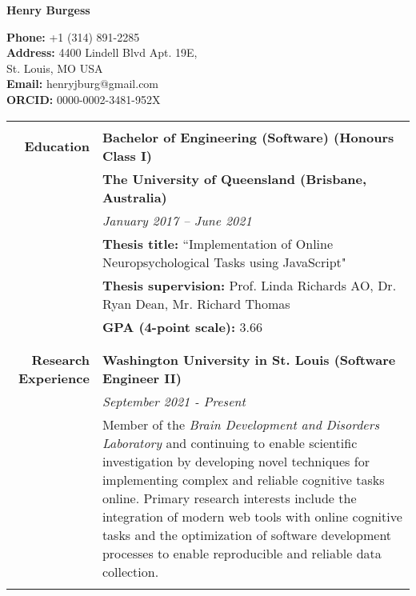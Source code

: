 \documentclass{article}
\begin{document}
	\begin{minipage}{2.5in}
		\huge\textbf{Henry Burgess} 
	\end{minipage}
	\hfill
	\begin{minipage}{3in}
		\textbf{Phone:}  +1 (314) 891-2285 \\
		\hfill \textbf{Address:} 4400 Lindell Blvd Apt. 19E, \\
		St. Louis, MO USA \\
		\textbf{Email:} henryjburg@gmail.com \\
		\textbf{ORCID:} 0000-0002-3481-952X
	\end{minipage}

	\begin{longtable}{>{\columncolor{LeftColumn}}r | p{13cm}}
											\hline \\
		\large\textbf{Education} 		  	& \large\textbf{Bachelor of Engineering (Software) (Honours Class I)} \\
											& \textbf{The University of Queensland (Brisbane, Australia)} \\
											& \textit{January 2017 – June 2021} \\
											& \textbf{Thesis title:} ``Implementation of Online Neuropsychological Tasks using JavaScript" \\
											& \textbf{Thesis supervision:} Prof. Linda Richards AO, Dr. Ryan Dean, Mr. Richard Thomas \\
											& \textbf{GPA (4-point scale):} 3.66 \\
											& \\
											\hline \\

		\large\textbf{Research Experience}  & \large\textbf{Washington University in St. Louis (Software Engineer II)} \\
											& \textit{September 2021 - Present} \\
											& Member of the \textit{Brain Development and Disorders Laboratory} and continuing to enable scientific investigation by developing novel techniques for implementing complex and reliable cognitive tasks online. Primary research interests include the integration of modern web tools with online cognitive tasks and the optimization of software development processes to enable reproducible and reliable data collection. \\ 
											& \\


\end{longtable}
\end{document}
